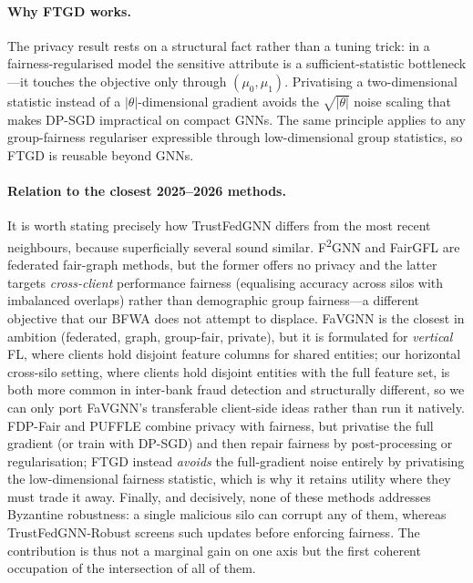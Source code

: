\documentclass[pdflatex,sn-mathphys-num]{sn-jnl}
\theoremstyle{thmstyleone}%
\theoremstyle{thmstyletwo}%
\theoremstyle{thmstylethree}%
\begin{document}
\paragraph{Why FTGD works.}
The privacy result rests on a structural fact rather than a tuning trick: in a
fairness-regularised model the sensitive attribute is a sufficient-statistic
bottleneck---it touches the objective only through $(\mu_0,\mu_1)$. Privatising
a two-dimensional statistic instead of a $|\theta|$-dimensional gradient avoids
the $\sqrt{|\theta|}$ noise scaling that makes DP-SGD impractical on compact
GNNs. The same principle applies to any group-fairness regulariser expressible
through low-dimensional group statistics, so FTGD is reusable beyond GNNs.

\paragraph{Relation to the closest 2025--2026 methods.}
It is worth stating precisely how TrustFedGNN differs from the most recent
neighbours, because superficially several sound similar. F\textsuperscript{2}GNN
and FairGFL are federated fair-graph methods, but the former offers no privacy
and the latter targets \emph{cross-client} performance fairness (equalising
accuracy across silos with imbalanced overlaps) rather than demographic group
fairness---a different objective that our BFWA does not attempt to displace.
FaVGNN is the closest in ambition (federated, graph, group-fair, private), but
it is formulated for \emph{vertical} FL, where clients hold disjoint feature
columns for shared entities; our horizontal cross-silo setting, where clients
hold disjoint entities with the full feature set, is both more common in
inter-bank fraud detection and structurally different, so we can only port
FaVGNN's transferable client-side ideas rather than run it natively. FDP-Fair
and PUFFLE combine privacy with fairness, but privatise the full gradient (or
train with DP-SGD) and then repair fairness by post-processing or regularisation;
FTGD instead \emph{avoids} the full-gradient noise entirely by privatising the
low-dimensional fairness statistic, which is why it retains utility where they
must trade it away. Finally, and decisively, none of these methods addresses
Byzantine robustness: a single malicious silo can corrupt any of them, whereas
TrustFedGNN-Robust screens such updates before enforcing fairness. The
contribution is thus not a marginal gain on one axis but the first coherent
occupation of the intersection of all of them.
\end{document}
